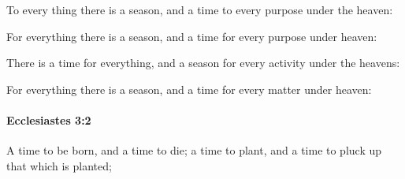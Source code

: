 			To every thing there is a season, and a time to every purpose under the heaven:

			\begin{versebox}
					\item[BHS] 
					\item[LXX] 
					\item[ASV] For everything there is a season, and a time for every purpose under heaven:
					\item[NIV] There is a time for everything, and a season for every activity under the heavens:
					\item[NRSV] For everything there is a season, and a time for every matter under heaven:
			\end{versebox}

		\paragraph{Ecclesiastes 3:2} %
			\label{ECCLESIASTES-3-2}

			A time to be born, and a time to die; a time to plant, and a time to pluck up that which is planted;

